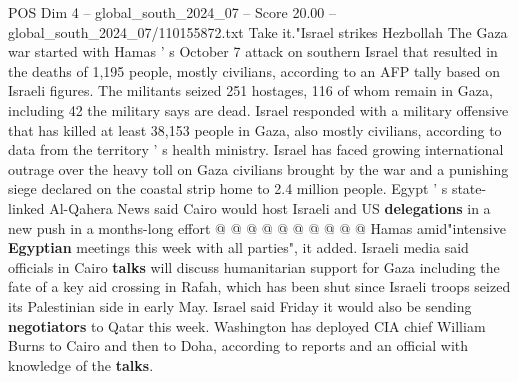 \begin{textsample}{POS Dim 4 – global\_south\_2024\_07 – Score 20.00 – global\_south\_2024\_07/110155872.txt}
Take it."Israel strikes Hezbollah The Gaza war started with Hamas ' s October 7 attack on southern Israel that resulted in the deaths of 1,195 people, mostly civilians, according to an AFP tally based on Israeli figures.
The militants seized 251 hostages, 116 of whom remain in Gaza, including 42 the military says are dead.
Israel responded with a military offensive that has killed at least 38,153 people in Gaza, also mostly civilians, according to data from the territory ' s health ministry.
Israel has faced growing international outrage over the heavy toll on Gaza civilians brought by the war and a punishing siege declared on the coastal strip home to 2.4 million people.
Egypt ' s state-linked Al-Qahera News said Cairo would host Israeli and US \textbf{delegations} in a new push in a months-long effort @ @ @ @ @ @ @ @ @ @ Hamas amid"intensive \textbf{Egyptian} meetings this week with all parties", it added.
Israeli media said officials in Cairo \textbf{talks} will discuss humanitarian support for Gaza including the fate of a key aid crossing in Rafah, which has been shut since Israeli troops seized its Palestinian side in early May.
Israel said Friday it would also be sending \textbf{negotiators} to Qatar this week.
Washington has deployed CIA chief William Burns to Cairo and then to Doha, according to reports and an official with knowledge of the \textbf{talks}.

\end{textsample}

